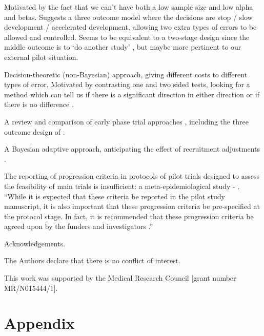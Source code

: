 \documentclass[Crown, times, sagev]{sagej}
\begin{document}
Motivated by the fact that we can't have both a low sample size and low alpha and betas. Suggests a three outcome model where the decisions are stop / slow development / accelerated development, allowing two extra types of errors to be allowed and controlled. Seems to be equivalent to a two-stage design since the middle outcome is to `do another study' \cite{Brown2012}, but maybe more pertinent to our external pilot situation.

Decision-theoretic (non-Bayesian) approach, giving different costs to different types of error. Motivated by contrasting one and two sided tests, looking for a method which can tell us if there is a significant direction in either direction or if there is no difference \cite{Emerson1987}.

A review and comparison of early phase trial approaches \cite{Kirby2016}, including the three outcome design of \cite{Brown2012}.

A Bayesian adaptive approach, anticipating the effect of recruitment adjustments \cite{Hampson2017}.

The reporting of progression criteria in protocols of pilot trials designed to assess the feasibility of main trials is insufficient: a meta-epidemiological study - \cite{Mbuagbaw2019}. ``While it is expected that these criteria be reported in the pilot study manuscript, it is also important that these progression criteria be pre-specified at the protocol stage. In fact, it is recommended that these progression criteria be agreed upon by the funders and investigators \cite{Avery2017}.''


\begin{acks}
Acknowledgements.
\end{acks}

\begin{dci}
The Authors declare that there is no conflict of interest.
\end{dci}

\begin{funding}
This work was supported by the Medical Research Council [grant number MR/N015444/1].
\end{funding}




\section*{Appendix}
\end{document}
